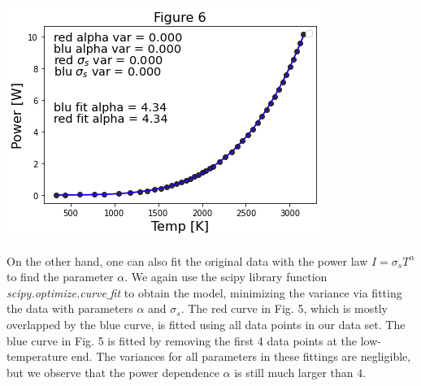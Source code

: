 \documentclass[11pt]{book}
\theoremstyle{break}
\theoremstyle{break}
\begin{document}
\begin{center}
\includegraphics[scale=0.65]{radPowFit.png}
\end{center}
On the other hand, one can also fit the original data with the power law $I = \sigma_s T^{\alpha}$ to find the parameter $\alpha$. We again use the scipy library function \textit{scipy.optimize.curve$\_$fit} to obtain the model, minimizing the variance via fitting the data with parameters $\alpha$ and $\sigma_s$. The red curve in Fig. 5, which is mostly overlapped by the blue curve, is fitted using all data points in our data set. The blue curve in Fig. 5 is fitted by removing the first 4 data points at the low-temperature end. The variances for all parameters in these fittings are negligible, but we observe that the power dependence $\alpha$ is still much larger than $4$. 



\newpage
\end{document}
